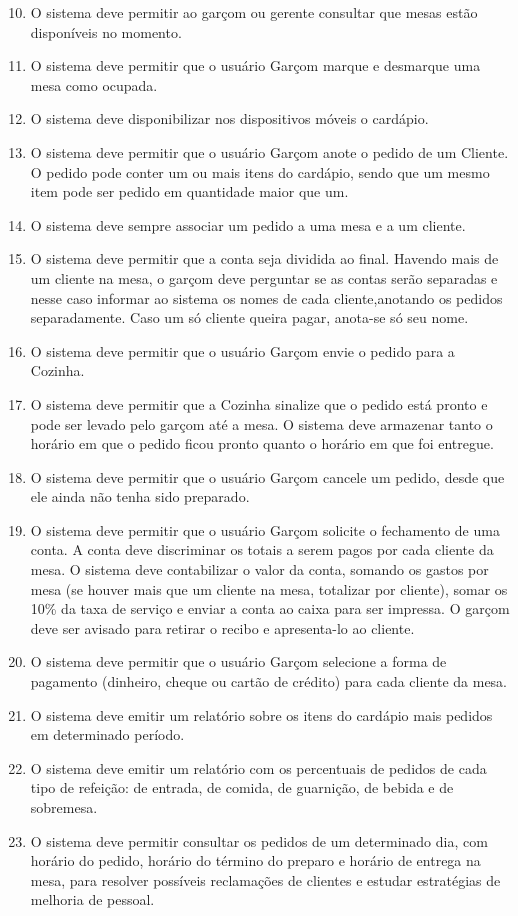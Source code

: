 \documentclass[11pt,a4paper]{article}
\begin{document}
\begin{enumerate}
\setcounter{enumi}{9}
    \item O sistema deve permitir ao garçom ou gerente consultar que mesas estão disponíveis no momento.
    \item O sistema deve permitir que o usuário Garçom marque e desmarque uma mesa como ocupada.
    \item O sistema deve disponibilizar nos dispositivos móveis o cardápio.
    \item O sistema deve permitir que o usuário Garçom anote o pedido de um Cliente. O pedido pode conter um ou mais itens do cardápio, sendo que um mesmo item pode ser pedido em quantidade maior que um.
    \item O sistema deve sempre associar um pedido a uma mesa e a um cliente.
    \item O sistema deve permitir que a conta seja dividida ao final. Havendo mais de um cliente na mesa, o garçom deve perguntar se as contas serão separadas e nesse caso informar ao sistema os nomes de cada cliente,anotando os pedidos separadamente. Caso um só cliente queira pagar, anota-se só seu nome.
    \item O sistema deve permitir que o usuário Garçom envie o pedido para a Cozinha.
    \item O sistema deve permitir que a Cozinha sinalize que o pedido está pronto e pode ser levado pelo garçom até a mesa. O sistema deve armazenar tanto o horário em que o pedido ficou pronto quanto o horário em que foi entregue.
    \item O sistema deve permitir que o usuário Garçom cancele um pedido, desde que ele ainda não tenha sido preparado.
    \item O sistema deve permitir que o usuário Garçom solicite o fechamento de uma conta. A conta deve discriminar os totais a serem pagos por cada cliente da mesa. O sistema deve contabilizar o valor da conta, somando os gastos por mesa (se houver mais que um cliente na mesa, totalizar por cliente), somar os 10\% da taxa de serviço e enviar a conta ao caixa para ser impressa. O garçom deve ser avisado para retirar o recibo e apresenta-lo ao cliente.
    \item O sistema deve permitir que o usuário Garçom selecione a forma de pagamento (dinheiro, cheque ou cartão de crédito) para cada cliente da mesa.
    \item O sistema deve emitir um relatório sobre os itens do cardápio mais pedidos em determinado período.
    \item O sistema deve emitir um relatório com os percentuais de pedidos de cada tipo de refeição: de entrada, de comida, de guarnição, de bebida e de sobremesa.
    \item O sistema deve permitir consultar os pedidos de um determinado dia, com horário do pedido, horário do término do preparo e horário de entrega na mesa, para resolver possíveis reclamações de clientes e estudar estratégias de melhoria de pessoal.
\end{enumerate}
\end{document}
